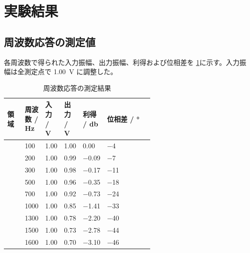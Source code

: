 \section{実験結果}
\label{sec:results}

\subsection{周波数応答の測定値}
\label{subsec:response-data}

各周波数で得られた入力振幅、出力振幅、利得および位相差を
\cref{tab:frequency-response}に示す。入力振幅は全測定点で
\qty{1.00}{\volt} に調整した。

\begin{table}[H]
  \centering
  \caption{周波数応答の測定結果}
  \label{tab:frequency-response}
  \small
  \setlength{\tabcolsep}{3.5pt}
  \begin{tabularx}{\linewidth}{
      >{\centering\arraybackslash}p{0.12\linewidth}
      >{\centering\arraybackslash}p{0.13\linewidth}
      >{\centering\arraybackslash}p{0.11\linewidth}
      >{\centering\arraybackslash}p{0.11\linewidth}
      >{\centering\arraybackslash}p{0.13\linewidth}
      >{\centering\arraybackslash}X}
    \toprule
    領域 & 周波数 / \unit{\hertz} & 入力 / \unit{\volt} & 出力 / \unit{\volt} & 利得 / \unit{\decibel} & 位相差 / \unit{\degree} \\
    \midrule
    \multirow{5}{*}{通過域}
      & \num{100}  & \num{1.00} & \num{1.00} & \num{0.00}  & \num{-4} \\
      & \num{200}  & \num{1.00} & \num{0.99} & \num{-0.09} & \num{-7} \\
      & \num{300}  & \num{1.00} & \num{0.98} & \num{-0.17} & \num{-11} \\
      & \num{500}  & \num{1.00} & \num{0.96} & \num{-0.35} & \num{-18} \\
      & \num{700}  & \num{1.00} & \num{0.92} & \num{-0.73} & \num{-24} \\
    \midrule
    \multirow{6}{*}{遷移域}
      & \num{1000} & \num{1.00} & \num{0.85} & \num{-1.41} & \num{-33} \\
      & \num{1300} & \num{1.00} & \num{0.78} & \num{-2.20} & \num{-40} \\
      & \num{1500} & \num{1.00} & \num{0.73} & \num{-2.78} & \num{-44} \\
      & \num{1600} & \num{1.00} & \num{0.70} & \num{-3.10} & \num{-46} \\

\end{tabularx}
\end{table}
